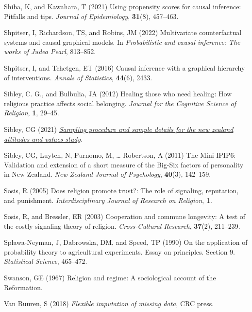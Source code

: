 \documentclass[
  single column]{article}
\newlength{\cslhangindent}
\newenvironment{CSLReferences}[2] %
 {\begin{list}{}{%
  \setlength{\itemindent}{0pt}
  \setlength{\leftmargin}{0pt}
  \setlength{\parsep}{0pt}
  \ifodd #1
   \setlength{\leftmargin}{\cslhangindent}
   \setlength{\itemindent}{-1\cslhangindent}
  \fi
  \setlength{\itemsep}{#2\baselineskip}}}
 {\end{list}}
\begin{document}
\begin{CSLReferences}{1}{0}
Shiba, K, and Kawahara, T (2021) Using propensity scores for causal
inference: Pitfalls and tips. \emph{Journal of Epidemiology},
\textbf{31}(8), 457--463.

Shpitser, I, Richardson, TS, and Robins, JM (2022) Multivariate
counterfactual systems and causal graphical models. In
\emph{Probabilistic and causal inference: The works of {J}udea {P}earl},
813--852.

Shpitser, I, and Tchetgen, ET (2016) Causal inference with a graphical
hierarchy of interventions. \emph{Annals of Statistics}, \textbf{44}(6),
2433.

Sibley, C. G., and Bulbulia, JA (2012) Healing those who need healing:
How religious practice affects social belonging. \emph{Journal for the
Cognitive Science of Religion}, \textbf{1}, 29--45.

Sibley, CG (2021)
\emph{\href{https://doi.org/10.31234/osf.io/wgqvy}{Sampling procedure
and sample details for the new zealand attitudes and values study}}.

Sibley, CG, Luyten, N, Purnomo, M, \ldots{} Robertson, A (2011) The
Mini-IPIP6: Validation and extension of a short measure of the Big-Six
factors of personality in New Zealand. \emph{New Zealand Journal of
Psychology}, \textbf{40}(3), 142--159.

Sosis, R (2005) Does religion promote trust?: The role of signaling,
reputation, and punishment. \emph{Interdisciplinary Journal of Research
on Religion}, \textbf{1}.

Sosis, R, and Bressler, ER (2003) Cooperation and commune longevity: A
test of the costly signaling theory of religion. \emph{Cross-Cultural
Research}, \textbf{37}(2), 211--239.

Splawa-Neyman, J, Dabrowska, DM, and Speed, TP (1990) On the application
of probability theory to agricultural experiments. Essay on principles.
Section 9. \emph{Statistical Science}, 465--472.

Swanson, GE (1967) Religion and regime: A sociological account of the
{R}eformation.

Van Buuren, S (2018) \emph{Flexible imputation of missing data}, CRC
press.


\end{CSLReferences}
\end{document}
